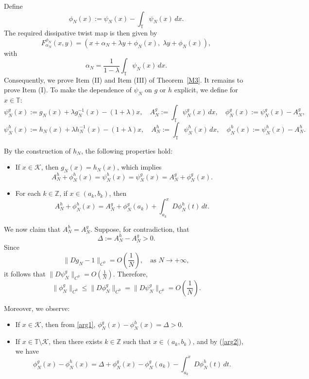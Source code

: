 \documentclass{amsart}
\newcommand{\Z}{\mathbb{Z}}
\newcommand{\T}{\mathbb{T}}
\theoremstyle{definition}
\begin{document}
Define
\[
\phi_N(x) := \psi_N(x) - \int_{\T} \psi_N(x)\, dx.
\]
The required dissipative twist map is then given by
\begin{equation}
F_{\alpha_N}^{\phi_N}(x,y) = \left(x + \alpha_N + \lambda y + \phi_N(x),\; \lambda y + \phi_N(x)\right),
\end{equation}
with
\[
\alpha_N = \frac{1}{1 - \lambda} \int_{\T} \psi_N(x)\, dx.
\]
Consequently, we prove Item (II) and Item (III) of Theorem~\ref{M3}. It remains to prove Item (I). To make the dependence of $\psi_N$ on $g$ or $h$ explicit, we define for $x \in \T$:
\[
\psi_N^g(x) := g_N(x) + \lambda g_N^{-1}(x) - (1 + \lambda)x, \quad A_N^g := \int_{\T} \psi_N^g(x) \, dx, \quad \phi_N^g(x) := \psi_N^g(x) - A_N^g,
\]
\[
\psi_N^h(x) := h_N(x) + \lambda h_N^{-1}(x) - (1 + \lambda)x, \quad A_N^h := \int_{\T} \psi_N^h(x) \, dx, \quad \phi_N^h(x) := \psi_N^h(x) - A_N^h.
\]

By the construction of $h_N$, the following properties hold:
\begin{itemize}
    \item If $x \in \mathcal{K}$, then $g_N(x) = h_N(x)$, which implies
    \begin{equation} \label{arg1}
        A_N^h + \phi_N^h(x) = \psi_N^h(x) = \psi_N^g(x) = A_N^g + \phi_N^g(x).
    \end{equation}

    \item For each $k \in \Z$, if $x \in (a_k, b_k)$, then
    \begin{equation} \label{arg2}
        A_N^h + \phi_N^h(x) = A_N^g + \phi_N^g(a_k) + \int_{a_k}^x D\phi_N^h(t) \, dt.
    \end{equation}
\end{itemize}

We now claim that $A_N^h = A_N^g$. Suppose, for contradiction, that
\[
\Delta := A_N^h - A_N^g > 0.
\]
Since
\[
\| Dg_N - 1 \|_{C^0} = O\left(\frac{1}{N}\right), \quad \text{as } N \to +\infty,
\]
it follows that $\| D\psi_N^g \|_{C^0} = O\left(\frac{1}{N}\right)$. Therefore,
\[
\| \phi_N^g \|_{C^0} \leq \| D\phi_N^g \|_{C^0} = \| D\psi_N^g \|_{C^0} = O\left(\frac{1}{N} \right).
\]

Moreover, we observe:
\begin{itemize}
    \item If $x \in \mathcal{K}$, then from \eqref{arg1}, $\phi_N^g(x) - \phi_N^h(x) = \Delta > 0$.
    \item If $x \in \T \setminus \mathcal{K}$, then there exists $k \in \Z$ such that $x \in (a_k, b_k)$, and by (\ref{arg2}), we have
    \[
    \phi_N^g(x) - \phi_N^h(x) = \Delta + \phi_N^g(x) - \phi_N^g(a_k) - \int_{a_k}^x D\phi_N^h(t) \, dt.
    \]
\end{itemize}
\end{document}
